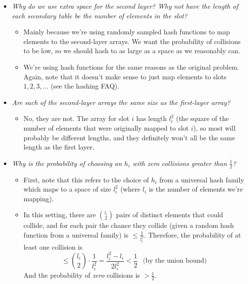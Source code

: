 \documentclass[11pt]{article}
\begin{document}
\begin{itemize}
\item \textit{Why do we use extra space for the second layer? Why not have the length of each secondary table be the number of elements in the slot?}
  \begin{itemize}
  \item Mainly because we're using randomly sampled hash functions to map elements to the second-layer arrays. We want the probability of collisions to be low, so we should hash to as large as a space as we reasonably can.
  \item We're using hash functions for the same reasons as the original problem. Again, note that it doesn't make sense to just map elements to slots $1, 2, 3, ...$ (see the hashing FAQ).
  \end{itemize}

\item \textit{Are each of the second-layer arrays the same size as the first-layer array?}
  \begin{itemize}
  \item No, they are not. The array for slot $i$ has length $l_i^2$ (the square of the number of elements that were originally mapped to slot $i$), so most will probably be different lengths, and they definitely won't all be the same length as the first layer.
  \end{itemize}

\item \textit{Why is the probability of choosing an $h_i$ with zero collisions greater than $\frac{1}{2}$?}
  \begin{itemize}
  \item First, note that this refers to the choice of $h_i$ from a universal hash family which maps to a space of size $l_i^2$ (where $l_i$ is the number of elements we're mapping).
  \item In this setting, there are ${l_i \choose 2}$ pairs of distinct elements that could collide, and for each pair the chance they collide (given a random hash function from a universal family) is $\leq \frac{1}{l_i^2}$. Therefore, the probability of at least one collision is
  $$\leq {l_i \choose 2} \cdot \frac{1}{l_i^2} = \frac{l_i^2 - l_i}{2l_i^2} < \frac{1}{2}\:\: \text{ (by the union bound)}$$
  And the probability of \textit{zero} collisions is $> \frac{1}{2}$.
  \end{itemize}
\end{itemize}

\newpage
\end{document}
